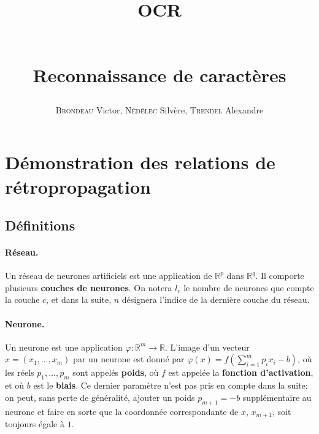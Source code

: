 \documentclass[12pt]{article}
\title{\begin{Huge}\textbf{OCR}\end{Huge}\\ \textbf{Reconnaissance de caractères}}
\author{\textsc{Brondeau} Victor, \textsc{Nédélec} Silvère, \textsc{Trendel} Alexandre}
\date{}
\newcommand{\lc}[1]{l_{#1}}
\begin{document}




\pagestyle{headings}

\section{Démonstration des relations de rétropropagation}

	\subsection{Définitions}

		\paragraph{Réseau.}
		
			Un réseau de neurones artificiels est une application de $\mathbb{R}^p$ dans $\mathbb{R}^q$. Il comporte plusieurs \textbf{couches de neurones}. On notera $\lc{c}$ le nombre de neurones que compte la couche $c$, et dans la suite, $n$ désignera l'indice de la dernière couche du réseau.

		\paragraph{Neurone.}
		
			Un neurone est une application $\varphi : \mathbb{R}^m \to \mathbb{R}$. L'image d'un vecteur $x = (x_1, \ldots, x_m)$ par un neurone est donné par $\varphi(x) = f(\sum_{i=1}^m p_i x_i - b)$, où les réels $p_1, \ldots, p_m$ sont appelés \textbf{poids}, où $f$ est appelée la \textbf{fonction d'activation}, et où $b$ est le \textbf{biais}. Ce dernier paramètre n'est pas pris en compte dans la suite: on peut, sans perte de généralité, ajouter un poids $p_{m+1} = -b$ supplémentaire au neurone et faire en sorte que la coordonnée correspondante de $x$, $x_{m+1}$, soit toujours égale à $1$.
\end{document}

